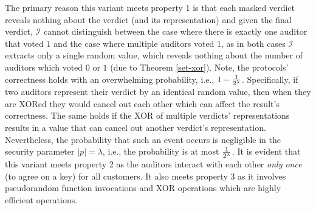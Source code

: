\vspace{-3mm}

The primary reason this variant meets property 1 is that each masked verdict reveals nothing about the verdict (and its representation) and given the final verdict, $\mathcal{I}$ cannot distinguish between the case where there is exactly one auditor that voted  $1$ and the case where multiple auditors voted $1$, as in both cases $\mathcal{I}$   extracts only a single random value, which reveals nothing about the number of auditors which voted $0$ or $1$ (due to Theorem \ref{set-xor}).   Note,  the protocols' correctness holds with an overwhelming probability, i.e., $1-\frac{1}{2^{\scriptscriptstyle \lambda}}$. Specifically, if two auditors represent their verdict by an identical random value, then when they are XORed they would cancel out each other which can affect the result's correctness. The same holds if the XOR of multiple verdicts' representations results in a value that can cancel out another verdict's representation. Nevertheless, the probability that such an event occurs is negligible in the security parameter $|p|=\lambda$, i.e., the probability is at most   $\frac{1}{2^{\scriptscriptstyle \lambda}}$. It is evident that this variant meets property 2 as the auditors interact with each other \emph{only once} (to agree on a key) for all customers. It also meets property 3 as it involves pseudorandom function invocations and XOR operations which are highly efficient operations. 


